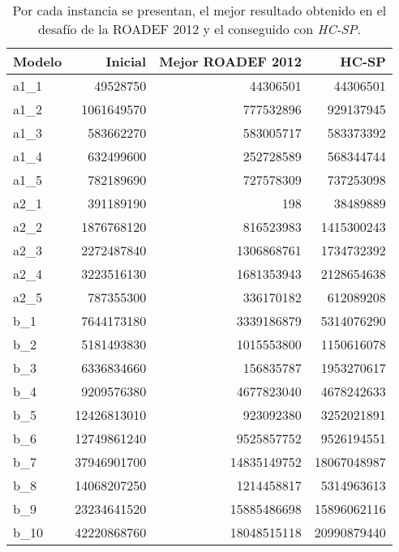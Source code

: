 \documentclass[../informe2.tex]{subfiles}
\begin{document}
\begin{table}[h]
	\small
\centering
\begin{tabular}{@{}lrrr@{}}
\toprule
Modelo & Inicial & Mejor ROADEF 2012 & HC-SP \\ \midrule
a1\_1  & 49528750               & 44306501            & 44306501              \\
a1\_2  & 1061649570             & 777532896           & 929137945             \\
a1\_3  & 583662270              & 583005717           & 583373392             \\
a1\_4  & 632499600              & 252728589           & 568344744             \\
a1\_5  & 782189690              & 727578309           & 737253098             \\
a2\_1  & 391189190              & 198                 & 38489889              \\
a2\_2  & 1876768120             & 816523983           & 1415300243            \\
a2\_3  & 2272487840             & 1306868761          & 1734732392            \\
a2\_4  & 3223516130             & 1681353943          & 2128654638            \\
a2\_5  & 787355300              & 336170182           & 612089208             \\
b\_1   & 7644173180             & 3339186879          & 5314076290            \\
b\_2   & 5181493830             & 1015553800          & 1150616078            \\
b\_3   & 6336834660             & 156835787           & 1953270617            \\
b\_4   & 9209576380             & 4677823040          & 4678242633            \\
b\_5   & 12426813010            & 923092380           & 3252021891            \\
b\_6   & 12749861240            & 9525857752          & 9526194551            \\
b\_7   & 37946901700            & 14835149752         & 18067048987           \\
b\_8   & 14068207250            & 1214458817          & 5314963613            \\
b\_9   & 23234641520            & 15885486698         & 15896062116           \\
b\_10  & 42220868760            & 18048515118         & 20990879440           \\ \bottomrule
\end{tabular}
\caption{\small Por cada instancia se presentan, el mejor resultado obtenido en el desafío de la ROADEF 2012 y el conseguido con \textit{HC-SP}.}
\label{tabla:comparative-with-best-roadef}
\end{table}
\end{document}
